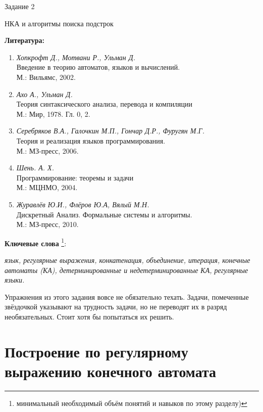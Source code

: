 \documentclass[12pt]{article}
\theoremstyle{definiton}
\theoremstyle{definition}
\theoremstyle{definition}
\begin{document}
	\centerline{\LARGE Задание 2}

	\medskip

	\centerline{\Large НКА и алгоритмы поиска подстрок}

	\bigskip

	{\bf Литература: }
	\begin{enumerate}
		\item {\em Хопкрофт Д., Мотвани Р., Ульман Д.}\\ Введение в теорию автоматов, языков и вычислений.\\ М.: Вильямс, 2002.

	\item {\it Ахо А., Ульман Д.}\\ Теория синтаксического анализа, перевода и компиляции\\  М.: Мир, 1978. Гл. 0, 2.

	\item {\em Серебряков В.А., Галочкин М.П., Гончар Д.Р., Фуругян М.Г.}\\ Теория и реализация языков программирования.\\ М.: МЗ-пресс, 2006.
	
	\item {\em Шень. А. Х. }\\ Программирование: теоремы и задачи \\ М.: МЦНМО, 2004.

	\item {\em Журавлёв Ю.И., Флёров Ю.А, Вялый М.Н.}\\ Дискретный Анализ. Формальные системы и алгоритмы. \\ М.: МЗ-пресс, 2010.

	\end{enumerate}

	{\bf Ключевые слова }\footnote{минимальный необходимый объём понятий и навыков по
	этому разделу)}:{\em  язык, регулярные выражения, конкатенация, объединение, итерация,
	конечные автоматы (КА), детерминированные и недетерминированные КА, регулярные языки.

	}
\medskip

Упражнения из этого задания вовсе не обязательно техать. Задачи, помеченные звёздочкой указывают на трудность задачи, но не переводят их в разряд необязательных. Стоит хотя бы попытаться их решить.

	\section{Построение по регулярному выражению конечного автомата }
	
\end{document}
